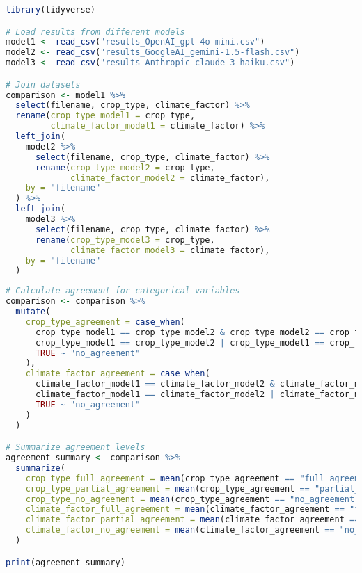 \begin{commandbox}
\begin{lstlisting}[language=R]
library(tidyverse)

# Load results from different models
model1 <- read_csv("results_OpenAI_gpt-4o-mini.csv")
model2 <- read_csv("results_GoogleAI_gemini-1.5-flash.csv")
model3 <- read_csv("results_Anthropic_claude-3-haiku.csv")

# Join datasets
comparison <- model1 %>%
  select(filename, crop_type, climate_factor) %>%
  rename(crop_type_model1 = crop_type,
         climate_factor_model1 = climate_factor) %>%
  left_join(
    model2 %>%
      select(filename, crop_type, climate_factor) %>%
      rename(crop_type_model2 = crop_type,
             climate_factor_model2 = climate_factor),
    by = "filename"
  ) %>%
  left_join(
    model3 %>%
      select(filename, crop_type, climate_factor) %>%
      rename(crop_type_model3 = crop_type,
             climate_factor_model3 = climate_factor),
    by = "filename"
  )
\end{lstlisting}
\end{commandbox}
\begin{commandbox}
\begin{lstlisting}[language=R]
# Calculate agreement for categorical variables
comparison <- comparison %>%
  mutate(
    crop_type_agreement = case_when(
      crop_type_model1 == crop_type_model2 & crop_type_model2 == crop_type_model3 ~ "full_agreement",
      crop_type_model1 == crop_type_model2 | crop_type_model1 == crop_type_model3 | crop_type_model2 == crop_type_model3 ~ "partial_agreement",
      TRUE ~ "no_agreement"
    ),
    climate_factor_agreement = case_when(
      climate_factor_model1 == climate_factor_model2 & climate_factor_model2 == climate_factor_model3 ~ "full_agreement",
      climate_factor_model1 == climate_factor_model2 | climate_factor_model1 == climate_factor_model3 | climate_factor_model2 == climate_factor_model3 ~ "partial_agreement",
      TRUE ~ "no_agreement"
    )
  )

# Summarize agreement levels
agreement_summary <- comparison %>%
  summarize(
    crop_type_full_agreement = mean(crop_type_agreement == "full_agreement"),
    crop_type_partial_agreement = mean(crop_type_agreement == "partial_agreement"),
    crop_type_no_agreement = mean(crop_type_agreement == "no_agreement"),
    climate_factor_full_agreement = mean(climate_factor_agreement == "full_agreement"),
    climate_factor_partial_agreement = mean(climate_factor_agreement == "partial_agreement"),
    climate_factor_no_agreement = mean(climate_factor_agreement == "no_agreement")
  )

print(agreement_summary)
\end{lstlisting}
\end{commandbox}


